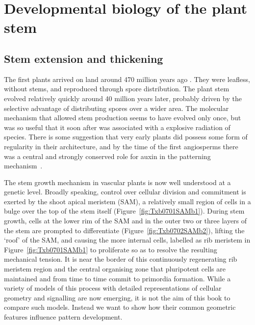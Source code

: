 \chapter[Developmental biology of the plant]{Developmental biology of the plant stem}
\label{ch:developmental}
\label{sec:bio}
\section{Stem extension and thickening}
The first plants arrived on land around 470 million years ago \cite{ingrouillePlantsDiversityEvolution2006,harrisonOriginEarlyEvolution2018}. They were leafless, without stems, and reproduced through spore distribution. The plant stem evolved relatively quickly around 40 million years later, probably driven by the selective advantage of distributing spores over a wider area.
The molecular mechanism that allowed stem production seems to have evolved only once, but was so useful that it soon after was associated with a explosive radiation of species. There is some suggestion that very early plants did possess some form of regularity in their architecture, and by the time of the first angiosperms there was a central and strongly conserved role for auxin in the patterning mechanism~\cite{reinhardtLawOrderPlants2022}. 

The stem growth mechanism in vascular plants is now well understood at a genetic level. Broadly speaking, control over cellular division and commitment is exerted by the shoot apical meristem (SAM), a relatively small region of cells in a bulge over the top of the stem itself (Figure~\ref{fig:Txb0701SAMb1}). During stem growth, cells at the lower rim of the SAM and in the outer two or three layers of the stem are prompted to differentiate (Figure~\ref{fig:Txb0702SAMb2}), lifting the `roof' of the SAM, and causing the more internal cells, labelled as rib meristem in Figure~\ref{fig:Txb0701SAMb1} to proliferate so as to resolve the resulting mechanical tension. It is near the border of this continuously regenerating rib meristem region and the central organising zone that pluripotent cells are maintained and from time to time commit to primordia formation. While a variety of models of this process with detailed representations of cellular geometry and signalling are now emerging,  it is not the aim of this book to compare such models. Instead we want to show how their common geometric features influence pattern development. 

